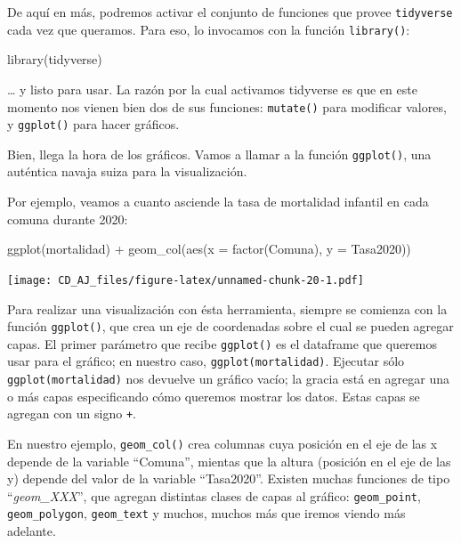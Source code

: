 \documentclass[
]{book}
\newenvironment{Shaded}{\begin{snugshade}}{\end{snugshade}}
\newcommand{\AttributeTok}[1]{\textcolor[rgb]{0.77,0.63,0.00}{#1}}
\newcommand{\FunctionTok}[1]{\textcolor[rgb]{0.00,0.00,0.00}{#1}}
\newcommand{\NormalTok}[1]{#1}
\newcommand{\SpecialCharTok}[1]{\textcolor[rgb]{0.00,0.00,0.00}{#1}}
\begin{document}
De aquí en más, podremos activar el conjunto de funciones que provee \texttt{tidyverse} cada vez que queramos. Para eso, lo invocamos con la función \texttt{library()}:

\begin{Shaded}
\begin{Highlighting}[]
\FunctionTok{library}\NormalTok{(tidyverse)}
\end{Highlighting}
\end{Shaded}

\ldots{} y listo para usar. La razón por la cual activamos tidyverse es que en este momento nos vienen bien dos de sus funciones: \texttt{mutate()} para modificar valores, y \texttt{ggplot()} para hacer gráficos.

Bien, llega la hora de los gráficos. Vamos a llamar a la función \texttt{ggplot()}, una auténtica navaja suiza para la visualización.

Por ejemplo, veamos a cuanto asciende la tasa de mortalidad infantil en cada comuna durante 2020:

\begin{Shaded}
\begin{Highlighting}[]
\FunctionTok{ggplot}\NormalTok{(mortalidad) }\SpecialCharTok{+}
    \FunctionTok{geom\_col}\NormalTok{(}\FunctionTok{aes}\NormalTok{(}\AttributeTok{x =} \FunctionTok{factor}\NormalTok{(Comuna), }\AttributeTok{y =}\NormalTok{ Tasa2020))}
\end{Highlighting}
\end{Shaded}

\texttt{[image: CD\_AJ\_files/figure-latex/unnamed-chunk-20-1.pdf]}

Para realizar una visualización con ésta herramienta, siempre se comienza con la función \texttt{ggplot()}, que crea un eje de coordenadas sobre el cual se pueden agregar capas. El primer parámetro que recibe \texttt{ggplot()} es el dataframe que queremos usar para el gráfico; en nuestro caso, \texttt{ggplot(mortalidad)}. Ejecutar sólo \texttt{ggplot(mortalidad)} nos devuelve un gráfico vacío; la gracia está en agregar una o más capas especificando cómo queremos mostrar los datos. Estas capas se agregan con un signo \texttt{+}.

En nuestro ejemplo, \texttt{geom\_col()} crea columnas cuya posición en el eje de las x depende de la variable ``Comuna'', mientas que la altura (posición en el eje de las y) depende del valor de la variable ``Tasa2020''. Existen muchas funciones de tipo ``\emph{geom\_XXX}'', que agregan distintas clases de capas al gráfico: \texttt{geom\_point}, \texttt{geom\_polygon}, \texttt{geom\_text} y muchos, muchos más que iremos viendo más adelante.
\end{document}
